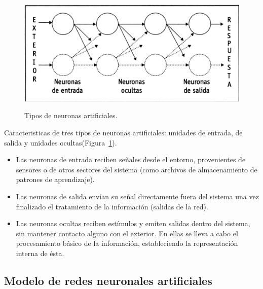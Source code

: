 \begin{figure}[H]
  \begin{center}
    \includegraphics[scale=0.90]{./tipo_neuronas.png}
    \caption{Tipos de neuronas artificiales.}\cite{lopez2008redes}
    \label{fig:tipo}
  \end{center}
\end{figure}

Caracteristicas de tres tipos de neuronas artificiales: unidades de entrada, de
salida y unidades ocultas(Figura~\ref{fig:tipo})\cite{lopez2008redes}.

\begin{itemize}
  \item  Las neuronas de entrada reciben señales desde el entorno, provenientes de
        sensores o de otros sectores del sistema (como archivos de almacenamiento de
        patrones de aprendizaje).

  \item Las neuronas de salida envían su señal directamente fuera del sistema una vez
        finalizado el tratamiento de la información (salidas de la red).

  \item Las neuronas ocultas reciben estímulos y emiten salidas dentro del sistema, sin
        mantener contacto alguno con el exterior. En ellas se lleva a cabo el
        procesamiento básico de la información, estableciendo la representación interna
        de ésta.
\end{itemize}

\subsection{Modelo de redes neuronales artificiales}

